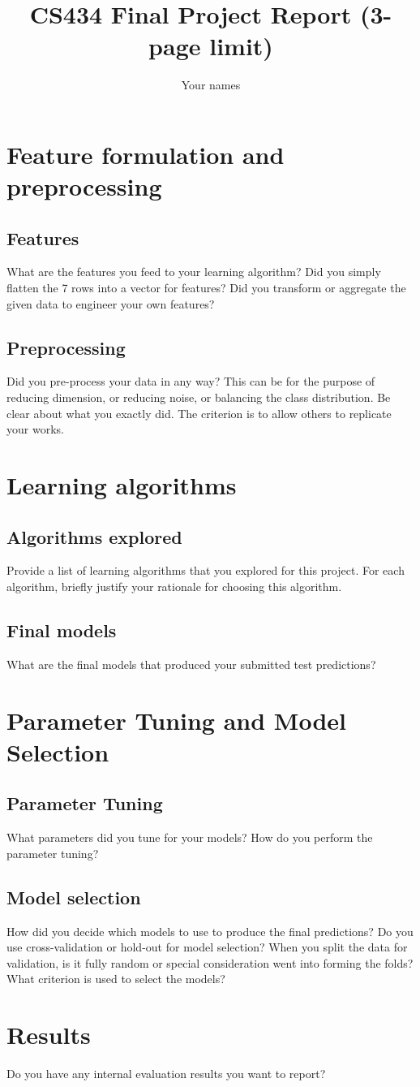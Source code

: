\documentclass[11pt,a4paper]{article}
\title{CS434 Final Project Report (3-page limit)}
\author{Your names}
\date{}
\begin{document}
\maketitle
\section{Feature formulation and preprocessing}
\subsection{Features} What are the features you feed to your learning algorithm? Did you simply flatten the 7 rows into a vector for features? Did you transform or aggregate the given data to engineer your own features?

\subsection{Preprocessing}
Did you pre-process your data in any way? This can be for the purpose of reducing dimension, or reducing noise, or balancing the class distribution. Be clear about what you exactly did. The criterion is to allow others to replicate your works.

\section{Learning algorithms}
\subsection{Algorithms explored}
Provide a list of learning algorithms that you explored for this project. For each algorithm, briefly justify your rationale for choosing this algorithm.
\subsection{Final models}
What are the final models that produced your submitted test predictions?

\section{Parameter Tuning and Model Selection }
\subsection{Parameter Tuning}
What parameters did you tune for your models? How do you perform the parameter tuning?

\subsection{Model selection}
How did you decide which models to use to produce the final predictions?  Do you use cross-validation or hold-out for model selection? When you split the data for validation, is it fully random or special consideration went into forming the folds? What criterion is used to select the models?

\section{Results}
Do you have any internal evaluation results you want to report?
\end{document}

